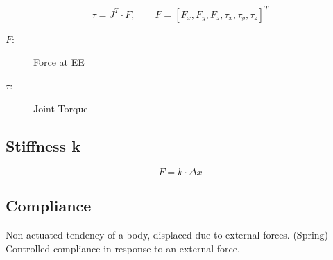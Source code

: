 \vspace{-0.5em}
$$
    \tau = J^T \cdot F, \qquad F = [F_x, F_y, F_z, \tau_x, \tau_y, \tau_z]^T
$$
\begin{description}
    \item[$F :$] Force at EE 
    \item[$\tau :$] Joint Torque 
\end{description}

\subsection{Stiffness k}
    \vspace{-1em}
    $$
        F = k \cdot \Delta x
    $$
\subsection{Compliance}
            Non-actuated tendency of a body, displaced due to external forces. (Spring)
            Controlled compliance in response to an external force.
